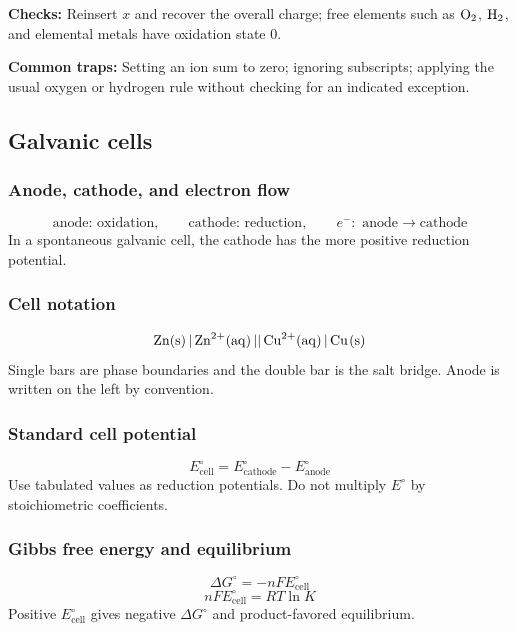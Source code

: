 \textbf{Checks:} Reinsert \(x\) and recover the overall charge; free elements such as \(\ce{O2}\), \(\ce{H2}\), and elemental metals have oxidation state \(0\).

\textbf{Common traps:} Setting an ion sum to zero; ignoring subscripts; applying the usual oxygen or hydrogen rule without checking for an indicated exception.

\subsection{Galvanic cells}

\subsubsection{Anode, cathode, and electron flow}
\begin{equation}
\label{eq:electrochem:electrode-processes}
\text{anode: oxidation}, \qquad \text{cathode: reduction}, \qquad e^-:\text{ anode}\rightarrow\text{cathode}
\end{equation}
In a spontaneous galvanic cell, the cathode has the more positive reduction potential.

\subsubsection{Cell notation}
\begin{equation}
\label{eq:electrochem:cell-notation-example}
\ce{Zn(s) | Zn^2+(aq) || Cu^2+(aq) | Cu(s)}
\end{equation}
Single bars are phase boundaries and the double bar is the salt bridge. Anode is written on the left by convention.

\subsubsection{Standard cell potential}
\begin{equation}
\label{eq:electrochem:standard-cell-potential}
E^\circ_{\mathrm{cell}}=E^\circ_{\mathrm{cathode}}-E^\circ_{\mathrm{anode}}
\end{equation}
Use tabulated values as reduction potentials. Do not multiply \(E^\circ\) by stoichiometric coefficients.

\subsubsection{Gibbs free energy and equilibrium}
\begin{equation}
\label{eq:electrochem:gibbs-from-potential}
\Delta G^\circ=-nFE^\circ_{\mathrm{cell}}
\end{equation}
\begin{equation}
\label{eq:electrochem:equilibrium-from-potential}
nFE^\circ_{\mathrm{cell}}=RT\ln K
\end{equation}
Positive \(E^\circ_{\mathrm{cell}}\) gives negative \(\Delta G^\circ\) and product-favored equilibrium.

